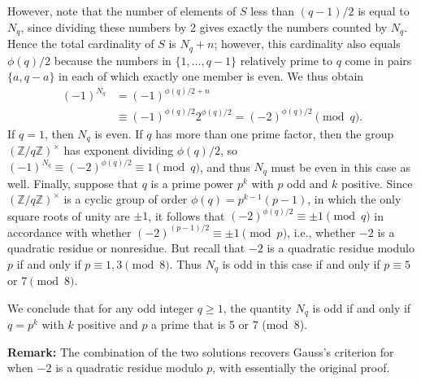 \documentclass[amssymb,twocolumn,pra,10pt,aps]{revtex4-1}
\begin{document}
\begin{itemize}
However, note that the number of elements of $S$ less than $(q-1)/2$ is equal to $N_q$, since dividing these numbers by 2 gives exactly the numbers counted by $N_q$. Hence the total cardinality of $S$ is $N_q + n$; however, this cardinality also equals $\phi(q)/2$ because the numbers in $\{1,\dots,q-1\}$ relatively prime to $q$ come in pairs
$\{a,q-a\}$ in each of which exactly one member is even. We thus obtain
\begin{align*}
(-1)^{N_q} &= (-1)^{\phi(q)/2 + n} \\
&\equiv (-1)^{\phi(q)/2} 2^{\phi(q)/2} = (-2)^{\phi(q)/2} \pmod{q}.
\end{align*}
If $q=1$, then $N_q$ is even.  If $q$ has more than one prime factor, then the group $(\mathbb{Z}/q\mathbb{Z})^\times$ has exponent dividing $\phi(q)/2$, so $(-1)^{N_q}\equiv (-2)^{\phi(q)/2} \equiv 1 \pmod{q}$, and thus $N_q$ must be even in this case as well.  Finally, suppose that $q$ is a prime power $p^k$ with $p$ odd and $k$ positive.  Since $(\mathbb{Z}/q\mathbb{Z})^\times$ is a cyclic group of order $\phi(q)=p^{k-1}(p-1)$, in which the only square roots of unity are $\pm 1$, it follows that $(-2)^{\phi(q)/2}\equiv \pm 1 \pmod{q}$ in accordance with whether $(-2)^{(p-1)/2} \equiv \pm 1 \pmod{p}$, i.e., whether $-2$ is a quadratic residue or nonresidue.  But recall that $-2$ is a quadratic residue modulo $p$ if and only if $p\equiv 1, 3 \pmod{8}$. Thus $N_q$ is odd in this case if and only if $p\equiv 5$ or $7 \pmod{8}$.

We conclude that for any odd integer $q\geq 1$, the quantity $N_q$ is odd if and only if $q=p^k$ with $k$ positive and $p$ a prime that is 5 or 7 (mod~8).

\noindent
\textbf{Remark:} The combination of the two solutions recovers Gauss's criterion for when $-2$ is a quadratic residue modulo $p$, with essentially the original proof.


\end{itemize}
\end{document}
